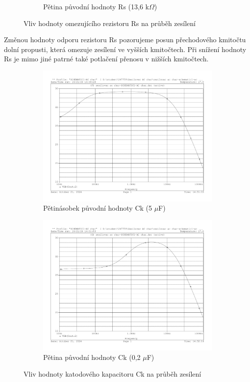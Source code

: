 \documentclass[a4paper, czech]{article}
\begin{document}
\begin{figure}[H]
\begin{subfigure}{0.49\textwidth}
        \caption{Pětina původní hodnoty Rs (13,6 k$\Omega$)}
    \end{subfigure}
    \caption{Vliv hodnoty omezujícího rezistoru Rs na průběh zesílení}
\end{figure}

Změnou hodnoty odporu rezistoru Rs pozorujeme posun přechodového kmitočtu dolní propusti, která omezuje zesílení ve vyšších kmitočtech.
Při snížení hodnoty Rs je mimo jiné patrné také potlačení přenosu v nižších kmitočtech.

\begin{figure}[H]
    \centering
    \begin{subfigure}{0.49\textwidth}
        \centering
        \includegraphics[width=\textwidth]{charakteristiky/uloha3_Ck_5krat_vetsi_5u.pdf}
        \caption{Pětinásobek původní hodnoty Ck (5 $\mu$F)}
    \end{subfigure}
    \hfill
    \begin{subfigure}{0.49\textwidth}
        \centering
        \includegraphics[width=\textwidth]{charakteristiky/uloha3_Ck_5krat_mensi_0_2u.pdf}
        \caption{Pětina původní hodnoty Ck (0,2 $\mu$F)}
    \end{subfigure}
    \caption{Vliv hodnoty katodového kapacitoru Ck na průběh zesílení}
\end{figure}
\end{document}
